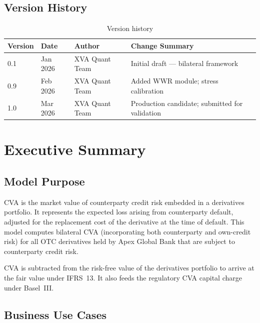 \documentclass[11pt,a4paper]{article}
\begin{document}
\subsection{Version History}

\begin{table}[h!]
\centering
\begin{tabular}{@{}llll@{}}
\toprule
\textbf{Version} & \textbf{Date} & \textbf{Author} & \textbf{Change Summary} \\
\midrule
0.1 & Jan 2026 & XVA Quant Team & Initial draft --- bilateral framework \\
0.9 & Feb 2026 & XVA Quant Team & Added WWR module; stress calibration \\
1.0 & Mar 2026 & XVA Quant Team & Production candidate; submitted for validation \\
\bottomrule
\end{tabular}
\caption{Version history}
\end{table}

\section{Executive Summary}

\subsection{Model Purpose}

CVA is the market value of counterparty credit risk embedded in a derivatives
portfolio. It represents the expected loss arising from counterparty default,
adjusted for the replacement cost of the derivative at the time of default.
This model computes bilateral CVA (incorporating both counterparty and
own-credit risk) for all OTC derivatives held by Apex Global Bank that are
subject to counterparty credit risk.

CVA is subtracted from the risk-free value of the derivatives portfolio to
arrive at the fair value under IFRS~13. It also feeds the regulatory CVA
capital charge under Basel~III.

\subsection{Business Use Cases}
\end{document}
